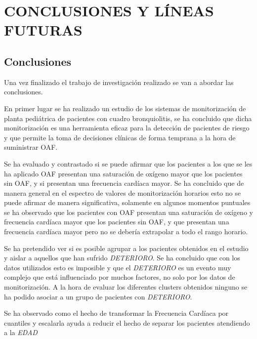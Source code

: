 \section{CONCLUSIONES Y LÍNEAS FUTURAS}\label{cap:conclusionesANDlineasfuturas}

\subsection{Conclusiones}\label{sec:conclusiones}

Una vez finalizado el trabajo de investigación realizado se van a abordar las conclusiones. 

En primer lugar se ha realizado un estudio de los sistemas de monitorización de planta pediátrica de pacientes con cuadro bronquiolitis, se ha concluido que dicha monitorización es una herramienta eficaz para la detección de pacientes de riesgo y que permite la toma de decisiones clínicas de forma temprana a la hora de suministrar OAF.

Se ha evaluado y contrastado si se puede afirmar que los pacientes a los que se les ha aplicado OAF presentan una saturación de oxígeno mayor que los pacientes sin OAF, y si presentan una frecuencia cardíaca mayor. Se ha concluido que de manera general en el espectro de valores de monitorización horarios esto no se puede afirmar de manera significativa, solamente en algunos momentos puntuales se ha observado que los pacientes con OAF presentan una saturación de oxígeno y frecuencia cardíaca mayor que los pacientes sin OAF, y que presentan una frecuencia cardíaca mayor pero no se debería extrapolar a todo el rango horario. 

Se ha pretendido ver si es posible agrupar a los pacientes obtenidos en el estudio y aislar a aquellos que han sufrido \textit{DETERIORO}. Se ha concluido que con los datos utilizados esto es imposible y que el \textit{DETERIORO} es un evento muy complejo que está influenciado por muchos factores, no solo por los datos de monitorización. A la hora de evaluar los diferentes clusters obtenidos ninguno se ha podido asociar a un grupo de pacientes con \textit{DETERIORO}.

Se ha observado como el hecho de transformar la Frecuencia Cardíaca por cuantiles y escalarla ayuda a reducir el hecho de separar los pacientes atendiendo a la \textit{EDAD} 